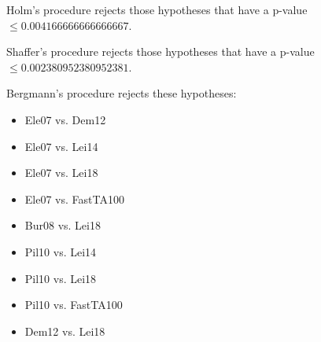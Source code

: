 \documentclass[a4paper,10pt]{article}
\begin{document}
\begin{landscape}
Holm's procedure rejects those hypotheses that have a p-value $\le0.004166666666666667$.


Shaffer's procedure rejects those hypotheses that have a p-value $\le0.002380952380952381$.


Bergmann's procedure rejects these hypotheses:


\begin{itemize}


\item Ele07 vs. Dem12
\item Ele07 vs. Lei14
\item Ele07 vs. Lei18
\item Ele07 vs. FastTA100
\item Bur08 vs. Lei18
\item Pil10 vs. Lei14
\item Pil10 vs. Lei18
\item Pil10 vs. FastTA100
\item Dem12 vs. Lei18
\end{itemize}



\end{landscape}
\end{document}
